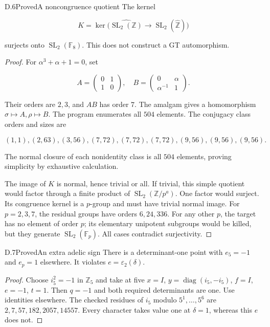 \begin{statement}{D.6}{Proved}{A noncongruence quotient}
The kernel

$$
K=\ker\bigl(\widehat{\operatorname{SL}_2(\mathbb Z)}
       \to\operatorname{SL}_2(\widehat{\mathbb Z})\bigr)
$$

surjects onto $\operatorname{SL}_2(\mathbb F_8)$.
This does not construct a GT automorphism.
\end{statement}
\begin{proof}
For $\alpha^3+\alpha+1=0$, set

$$
A=\begin{pmatrix}0&1\\1&0\end{pmatrix},\quad
 B=\begin{pmatrix}0&\alpha\\\alpha^{-1}&1\end{pmatrix}.
$$

Their orders are $2,3$, and $AB$ has order $7$.
The amalgam gives a homomorphism $\sigma\mapsto A,\rho\mapsto B$.
The program enumerates all $504$ elements. The conjugacy
class orders and sizes are

$$
(1,1),(2,63),(3,56),(7,72),(7,72),(7,72),
 (9,56),(9,56),(9,56).
$$

The normal closure of each nonidentity class is all $504$
elements, proving simplicity by exhaustive calculation.

The image of $K$ is normal, hence trivial or all.
If trivial, this simple quotient would factor through a
finite product of $\operatorname{SL}_2(\mathbb Z/p^a)$.
One factor would surject. Its congruence kernel is a
$p$-group and must have trivial normal image.
For $p=2,3,7$, the residual groups have orders $6,24,336$.
For any other $p$, the target has no element of order $p$;
its elementary unipotent subgroups would be killed, but
they generate $\operatorname{SL}_2(\mathbb F_p)$.
All cases contradict surjectivity.
\end{proof}

\begin{statement}{D.7}{Proved}{An extra adelic sign}
There is a determinant-one point with $e_5=-1$ and
$e_p=1$ elsewhere. It violates $e=\varepsilon_2(\delta)$.
\end{statement}
\begin{proof}
Choose $i_5^2=-1$ in $\mathbb Z_5$ and take at five
$x=I$, $y=\operatorname{diag}(i_5,-i_5)$, $f=I$,
$e=-1$, $t=1$. Then $q=-1$ and both required determinants
are one. Use identities elsewhere.
The checked residues of $i_5$ modulo $5^1,\ldots,5^6$
are $2,7,57,182,2057,14557$.
Every character takes value one at $\delta=1$,
whereas this $e$ does not.
\end{proof}


